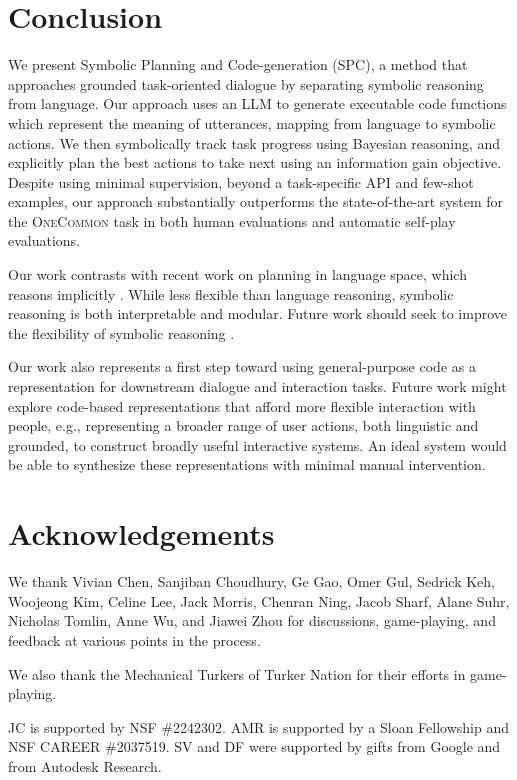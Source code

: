 \documentclass[11pt]{article}
\newcommand{\system}{SPC}
\begin{document}
\section{Conclusion}
We present Symbolic Planning and Code-generation (\system{}), a method that approaches grounded task-oriented dialogue by separating symbolic reasoning from language.  Our approach uses an LLM to generate executable code functions which represent the meaning of utterances, mapping from language to symbolic actions. We then symbolically track task progress using Bayesian reasoning,  and explicitly plan the best actions to take next using an information gain objective. 
Despite using minimal supervision, beyond a task-specific API and few-shot examples, our approach substantially outperforms the state-of-the-art system for the \textsc{OneCommon} task in both human evaluations and automatic self-play evaluations.

Our work contrasts with recent work on planning in language space, which reasons implicitly \citep{cot,yarats2017rollout,bamcp}.
While less flexible than language reasoning, symbolic reasoning is both interpretable and modular.
Future work should seek to improve the flexibility of symbolic reasoning \citep{wong2023word}.

Our work also represents a first step toward using general-purpose code as a representation for downstream dialogue and interaction tasks. Future work might explore code-based representations that afford more flexible interaction with people, e.g., representing a broader range of user actions, both linguistic and grounded, to construct broadly useful interactive systems. An ideal system would be able to synthesize these representations with minimal manual intervention.

\section*{Acknowledgements}
We thank Vivian Chen, Sanjiban Choudhury, Ge Gao, Omer Gul, Sedrick Keh, Woojeong Kim, Celine Lee, Jack Morris, Chenran Ning, Jacob Sharf, Alane Suhr, Nicholas Tomlin, Anne Wu, and Jiawei Zhou for discussions, game-playing, and feedback at various points in the process.

We also thank the Mechanical Turkers of Turker Nation for their efforts in game-playing.

JC is supported by NSF \#2242302. AMR is supported by a Sloan Fellowship and NSF CAREER \#2037519.
SV and DF were supported by gifts from Google and from Autodesk Research.
\end{document}
